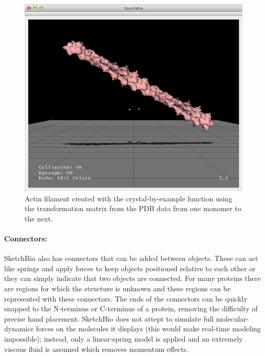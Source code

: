 \documentclass[twocolumn]{bmcart}%
\begin{document}
\begin{figure}[h]
\centering
\includegraphics[width=0.9\columnwidth]{crystal_actin.png}
\caption{Actin filament created with the crystal-by-example function using the transformation matrix from the PDB data from one monomer to the next.}
\label{fig:crystal_actin}
\end{figure}


\paragraph*{Connectors:}
SketchBio also has connectors that can be added between objects.
These can act like springs and apply forces to keep objects positioned relative to each other or they can simply indicate that two objects are connected.
For many proteins there are regions for which the structure is unknown and these regions can be represented with these connectors.
The ends of the connectors can be quickly snapped to the N-terminus or C-terminus of a protein, removing the difficulty of precise hand placement.
SketchBio does not attept to simulate full molecular-dynamics forces on the molecules it displays (this would make real-time modeling impossible); instead, only a linear-spring model is applied and an extremely viscous fluid is assumed which removes momentum effects.
\end{document}
